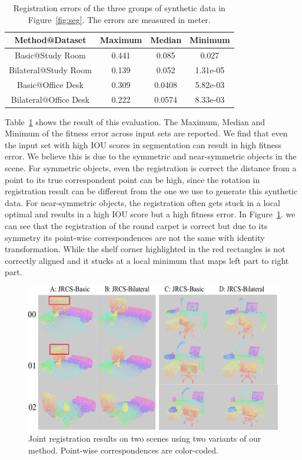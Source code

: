 \begin{table}
	\centering
	\caption{Registration errors of the three groups of synthetic data in Figure~\ref{fig:seg}. The errors are measured in meter.}
	\begin{tabular}{c | c c c}
		Method@Dataset&Maximum&Median&Minimum\\
		\hline 
		Basic@Study Room&0.441&0.085&0.027\\
		Bilateral@Study Room&0.139&0.052&1.31e-05\\
	    Basic@Office Desk&0.309&0.0408&5.82e-03\\
		Bilateral@Office Desk&0.222&0.0574&8.33e-03\\
	\end{tabular}
	\label{tab:regerror}
\end{table}

Table~\ref{tab:regerror} shows the result of this evaluation. The Maximum, Median and Minimum of the fitness error across input sets are reported.
%
We find that even the input set with high IOU scores in segmentation can result in high fitness error. We believe this is due to the symmetric and near-symmetric objects in the scene. For symmetric objects, even the registration is correct the distance from a point to its true correspondent point can be high, since the rotation in registration result can be different from the one we use to generate this synthetic data. For near-symmetric objects, the registration often gets stuck in a local optimal and results in a high IOU score but a high fitness error. In Figure~\ref{fig:reg_colorcode}. we can see that the registration of the round carpet is correct but due to its symmetry its point-wise correspondences are not the same with identity transformation.
While the shelf corner highlighted in the red rectangles is not correctly aligned and it stucks at a local minimum that maps left part to right part.
\begin{figure}[htb]
	\centering
	\includegraphics[width=\linewidth]{images/exp/exp_reg}
	\caption{Joint registration results on two scenes using two variants of our method. Point-wise correspondences are color-coded. }
	\label{fig:reg_colorcode}
\end{figure}
